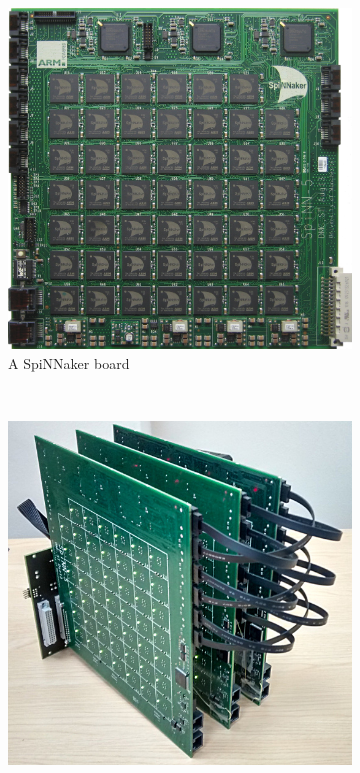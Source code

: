 		\begin{figure}
			\center
			\begin{subfigure}[b]{0.45\linewidth}
				\center
				\includegraphics[width=\linewidth]{figures/spinnakerBoard.jpg}
				
				\caption{A SpiNNaker board}
				\label{fig:spinnakerBoard}
			\end{subfigure}
			~~~
			\begin{subfigure}[b]{0.45\linewidth}
				\center
				\includegraphics[width=\linewidth]{figures/threeboard.jpg}
				

\end{subfigure}
\end{figure}
